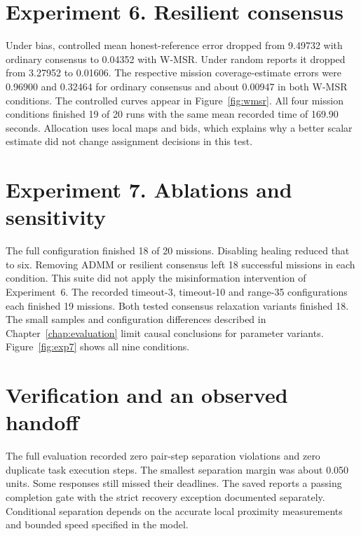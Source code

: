 \section{Experiment 6. Resilient consensus}
Under bias, controlled mean honest-reference error dropped from 9.49732 with ordinary consensus to 0.04352 with W-MSR. Under random reports it dropped from 3.27952 to 0.01606. The respective mission coverage-estimate errors were 0.96900 and 0.32464 for ordinary consensus and about 0.00947 in both W-MSR conditions. The controlled curves appear in Figure~\ref{fig:wmsr}. All four mission conditions finished 19 of 20 runs with the same mean recorded time of 169.90 seconds. Allocation uses local maps and bids, which explains why a better scalar estimate did not change assignment decisions in this test.

\FloatBarrier

\section{Experiment 7. Ablations and sensitivity}
The full configuration finished 18 of 20 missions. Disabling healing reduced that to six. Removing ADMM or resilient consensus left 18 successful missions in each condition. This suite did not apply the misinformation intervention of Experiment~6. The recorded timeout-3, timeout-10 and range-35 configurations each finished 19 missions. Both tested consensus relaxation variants finished 18. The small samples and configuration differences described in Chapter~\ref{chap:evaluation} limit causal conclusions for parameter variants. Figure~\ref{fig:exp7} shows all nine conditions.

\FloatBarrier

\section{Verification and an observed handoff}
The full evaluation recorded zero pair-step separation violations and zero duplicate task execution steps. The smallest separation margin was about 0.050 units. Some responses still missed their deadlines. The saved  reports a passing completion gate with the strict recovery exception documented separately. Conditional separation depends on the accurate local proximity measurements and bounded speed specified in the model.

